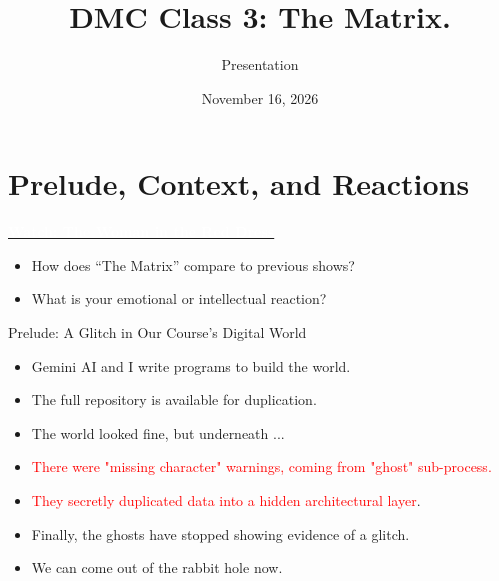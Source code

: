\documentclass[
  ignorenonframetext,
]{beamer}
\title{\texorpdfstring{DMC Class 3: The
Matrix.}{DMC Class 3: The Matrix.}}
\subtitle{\texorpdfstring{Presentation}{Presentation}}
\author{\texorpdfstring{}{}}
\date{November 16, 2026}
\providecommand{\tightlist}{%
  \setlength{\itemsep}{0pt}\setlength{\parskip}{0pt}}
\newcommand{\Cred}[1]{\textcolor{red}{#1}}
\newcommand{\Cgreen}[1]{\textcolor{green!70!black}{#1}}
\newcommand{\Cteal}[1]{\textcolor{teal!90!black}{#1}} %
\begin{document}
\frame{\titlepage}

\begin{frame}
\providecommand{\HLw}[2]{\leavevmode{\setlength{\fboxsep}{0pt}\colorbox{#1}{\strut #2}}}
\providecommand{\HLs}[1]{\leavevmode{\color{#1}\leaders\vrule height\ht\strutbox depth\dp\strutbox\hskip 0.333em plus 0.166em minus 0.111em}}
\end{frame}

\section{Prelude, Context, and
Reactions}\label{prelude-context-and-reactions}

\begin{frame}
\begin{center}
\bgroup
\setlength{\fboxsep}{10pt}
\colorbox{red!80!black}{\href{https://youtu.be/LZdlqTQ3PpY}{\textcolor{white}{\Large \textbf{Watch: The Woman in the Red Dress}}}}
\egroup
\end{center}
\vspace*{0.6in}

\begin{itemize}
\tightlist
\item
  How does ``The Matrix'' compare to previous shows? \vspace*{0.3in}
\item
  What is your emotional or intellectual reaction?
\end{itemize}
\end{frame}

\begin{frame}{Prelude: A Glitch in Our Course's Digital World}
\protect{}\label{prelude-a-glitch-in-our-courses-digital-world}
\begin{itemize}
\item
  \Cteal{Gemini AI and I write programs to build the world.}
\item
  \Cteal{The full repository is available for duplication.}
\item
  \Cteal{The world looked fine,  but underneath ...} \vspace*{0.2in}
\item
  \Cred{There were "missing character" warnings,   
             coming from "ghost" sub-process.}
\item
  \Cred{They secretly duplicated data into a hidden architectural layer}.
  \vspace*{0.2in}
\item
  \Cgreen{Finally, the ghosts have stopped showing evidence of a glitch.}
\item
  \Cgreen{We can come out of the rabbit hole now.}
\end{itemize}
\end{frame}
\end{document}

